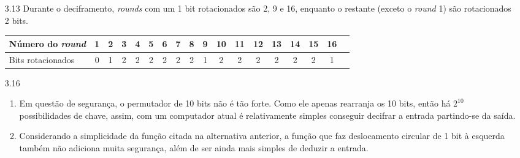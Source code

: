 \documentclass{article}
\begin{document}
\begin{enumerate}
    \item[3.13] Durante o deciframento, \textit{rounds} com um 1 bit
        rotacionados são 2, 9 e 16, enquanto o restante (exceto o
        \textit{round} 1) são rotacionados 2 bits. \\
    \begin{tabular}{|l|*{16}{c}|c}
        \hline
        Número do \textit{round} & 1 & 2 & 3 & 4 & 5 & 6 & 7 & 8 & 9 & 10 & 11
        & 12 & 13 & 14 & 15 & 16 \\
        
        \hline 
        Bits rotacionados & 0 & 1 & 2 & 2 & 2 & 2 & 2 & 2 & 1 & 2 & 2 & 2 & 2 &
        2 & 2 & 1\\
        
        \hline
    \end{tabular}

    \item[3.16] \begin{enumerate}
        \item Em questão de segurança, o permutador de 10 bits não é tão forte.
            Como ele apenas rearranja os 10 bits, então há $2^{10}$
            possibilidades de chave, assim, com um computador atual é
            relativamente simples conseguir decifrar a entrada partindo-se da
            saída.
        
        \item Considerando a simplicidade da função citada na alternativa
            anterior, a função que faz deslocamento circular de 1 bit à
            esquerda também não adiciona muita segurança, além de ser ainda
            mais simples de deduzir a entrada.
    \end{enumerate}
    

\end{enumerate}
\end{document}
